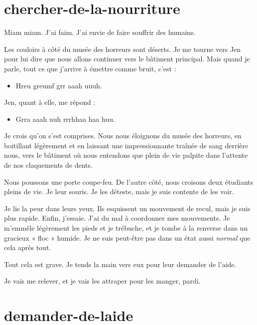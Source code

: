 
\section{chercher-de-la-nourriture}

Miam miam. J'ai faim. J'ai envie de faire souffrir des humains.

Les couloirs à côté du musée des horreurs sont déserts. Je me tourne vers Jen pour lui dire que nous allons continuer vers le bâtiment principal. Mais quand je parle, tout ce que j'arrive à émettre comme bruit, c'est :

\begin{itemize}
\item Hreu greumf grr aaah uuuh.
\end{itemize}

Jen, quant à elle, me répond :

\begin{itemize}
\item Grra aaah uuh rrrhhaa haa huu.
\end{itemize}

Je crois qu'on s'est comprises. Nous nous éloignons du musée des horreurs, en boitillant légèrement et en laissant une impressionnante traînée de sang derrière nous, vers le bâtiment où nous entendons que plein de vie palpite dans l'attente de nos claquements de dents.

Nous poussons une porte coupe-feu. De l'autre côté, nous croisons deux étudiants pleins de vie. Je leur souris. Je les déteste, mais je suis contente de les voir.

Je lis la peur dans leurs yeux. Ils esquissent un mouvement de recul, mais je suis plus rapide. Enfin, j'essaie. J'ai du mal à coordonner mes mouvements. Je m'emmêle légèrement les pieds et je trébuche, et je tombe à la renverse dans un gracieux « floc » humide. Je ne suis peut-être pas dans un état aussi \textit{normal} que cela après tout.

\item Tout cela est grave. Je tends la main vers eux pour leur demander de l'aide. 
\item Je vais me relever, et je vais les attraper pour les manger, pardi. 
\enw

\section{demander-de-laide}

